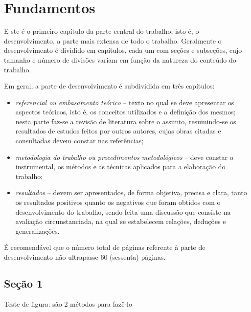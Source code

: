 \chapter{Fundamentos}

\lettrine[lines=3]{E}{} ste é o primeiro capítulo da parte central do trabalho, isto é, o desenvolvimento, a parte mais extensa de todo o trabalho. Geralmente o desenvolvimento é dividido em capítulos, cada um com seções e subseções, cujo tamanho e número de divisões variam em função da natureza do conteúdo do trabalho.

	Em geral, a parte de desenvolvimento é subdividida em três capítulos:

	\begin{itemize}
		\item \textit{referencial ou embasamento teórico} – texto no qual se deve apresentar os aspectos teóricos, isto é, os conceitos utilizados e a definição dos mesmos; nesta parte faz-se a revisão de literatura sobre o assunto, resumindo-se os resultados de estudos feitos por outros autores, cujas obras citadas e consultadas devem constar nas referências;
	
		\item \textit{metodologia do trabalho ou procedimentos metodológicos} – deve constar o instrumental, os métodos e as técnicas aplicados para a elaboração do trabalho;
	
		\item \textit{resultados} – devem ser apresentados, de forma objetiva, precisa e clara, tanto os resultados positivos quanto os negativos que foram obtidos com o desenvolvimento do trabalho, sendo feita uma discussão que consiste na avaliação circunstanciada, na qual se estabelecem relações, deduções e generalizações.
	\end{itemize}

	É recomendável que o número total de páginas referente à parte de desenvolvimento não ultrapasse 60 (sessenta) páginas.

	\section{Seção 1}

		Teste de figura: são 2 métodos para fazê-lo

